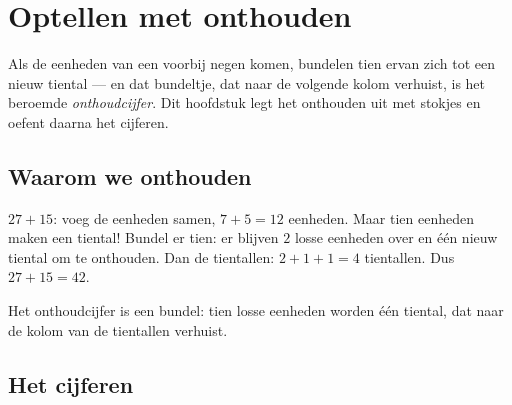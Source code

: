 \chapter{Optellen met onthouden}\label{ch:g2:addition}

Als de eenheden van een  voorbij negen komen, bundelen tien ervan
zich tot een nieuw tiental --- en dat bundeltje, dat naar de volgende
kolom verhuist, is het beroemde \emph{onthoudcijfer}. Dit hoofdstuk
legt het onthouden uit met stokjes en oefent daarna het cijferen.

\section{Waarom we onthouden}

\begin{example}\label{ex:g2:addition:bundle}
$27 + 15$: voeg de eenheden samen, $7 + 5 = 12$ eenheden. Maar tien
eenheden maken een tiental! Bundel er tien: er blijven $2$ losse
eenheden over en één nieuw tiental om te onthouden. Dan de tientallen:
$2 + 1 + 1 = 4$ tientallen. Dus $27 + 15 = 42$.
\end{example}

\begin{omfigure}

{\small Het onthoudcijfer is een bundel: tien losse eenheden worden één
tiental, dat naar de kolom van de tientallen verhuist.}
\end{omfigure}

\section{Het cijferen}

